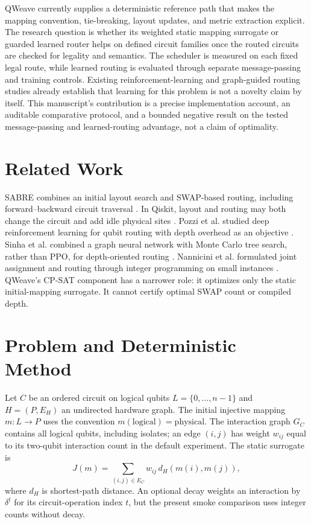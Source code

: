 \documentclass[a4paper,10pt,twocolumn]{article}
\begin{document}
QWeave currently supplies a deterministic reference path that makes the
mapping convention, tie-breaking, layout updates, and metric extraction
explicit. The research question is whether its weighted static mapping
surrogate or guarded learned router helps on defined circuit families once
the routed circuits are checked for legality and semantics. The scheduler is
measured on each fixed legal route, while learned routing is evaluated through
separate message-passing and training controls.
Existing reinforcement-learning
and graph-guided routing studies \cite{pozzi2020rl,sinha2022gnn} already
establish that learning for this problem is not a novelty claim by itself.
This manuscript's contribution is a precise implementation account, an
auditable comparative protocol, and a bounded negative result on the tested
message-passing and learned-routing advantage, not a claim of optimality.

\section{Related Work}
SABRE combines an initial layout search and SWAP-based routing, including
forward--backward circuit traversal \cite{li2019sabre}. In Qiskit, layout
and routing may both change the circuit and add idle physical sites
\cite{ibmsabre}. Pozzi et al. studied deep reinforcement learning for qubit
routing with depth overhead as an objective \cite{pozzi2020rl}. Sinha et al.
combined a graph neural network with Monte Carlo tree search, rather than
PPO, for depth-oriented routing \cite{sinha2022gnn}. Nannicini et al.
formulated joint assignment and routing through integer programming on
small instances \cite{nannicini2022ip}. QWeave's CP-SAT component has a
narrower role: it optimizes only the static initial-mapping surrogate. It
cannot certify optimal SWAP count or compiled depth.

\section{Problem and Deterministic Method}
Let $C$ be an ordered circuit on logical qubits $L=\{0,\ldots,n-1\}$ and
$H=(P,E_H)$ an undirected hardware graph. The initial injective mapping
$m:L\rightarrow P$ uses the convention
$m(\text{logical})=\text{physical}$. The interaction graph $G_C$ contains
all logical qubits, including isolates; an edge $(i,j)$ has weight $w_{ij}$
equal to its two-qubit interaction count in the default experiment. The
static surrogate is
\begin{equation}
 J(m)=\sum_{(i,j)\in E_C}w_{ij}\,d_H(m(i),m(j)),
 \label{eq:objective}
\end{equation}
where $d_H$ is shortest-path distance. An optional decay weights an
interaction by $\delta^t$ for its circuit-operation index $t$, but the
present smoke comparison uses integer counts without decay.
\end{document}

